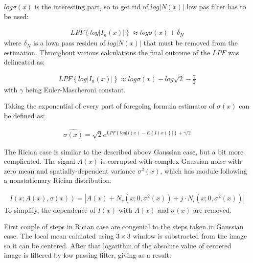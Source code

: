 $log\sigma(x)$ is the interesting part, so to get rid of $log\left | N(x) \right |$ low pas filter has to be used:

\begin{equation}
\begin{aligned}LPF\left \{ log\left |  I_{n}(x)\right | \right \}\approx log\sigma(x)+\delta _{N}\end{aligned}
\end{equation}
where $\delta_{N}$ is a lowa pass resideu of $log\left | N(x) \right |$ that must be removed from the estimation.
Throughout various calculations the final outcome of the $LPF$ was delineated as:

\begin{equation}
\begin{aligned}LPF\left \{ log\left |  I_{n}(x)\right | \right \}\approx log\sigma(x)-log\sqrt{2}-\frac{\gamma }{2}\end{aligned}
\end{equation}
with $\gamma$ being Euler-Mascheroni constant.

Taking the exponential of every part of foregoing formula estimator of $\sigma(x)$ can be defined as:

\begin{equation}
\begin{aligned}\widehat{\sigma(x)}=\sqrt{2}e^{LPF\left \{ log\left | I(x)-E\left \{ I(x) \right \} \right | \right \}+\gamma/2}\end{aligned}
\end{equation}


The Rician case is similar to the described abocv Gaussian case, but a bit more complicated. The signal $A(x)$ is corrupted with complex Gaussian noise with zero mean and spatially-dependent variance $\sigma^{2}(x)$, which has module following a nonstationary Rician distribution:


\begin{equation}
\begin{aligned}I(x;A(x),\sigma(x))=\left | A(x)+N_{r}(x;0,\sigma^{2}(x))+j\cdot N_{i}(x;0,\sigma^{2}(x)) \right |\end{aligned}
\end{equation}
To simplify, the dependence of $I(x)$ with $A(x)$ and $\sigma(x)$ are removed.

First couple of steps in Rician case are congenial to the steps taken in Gaussian case. The local mean calulated using $3\times 3$ window is substracted from the image so it can be centered. After that logarithm of the absolute value of centered image is filtered by low passing filter, giving as a result:

